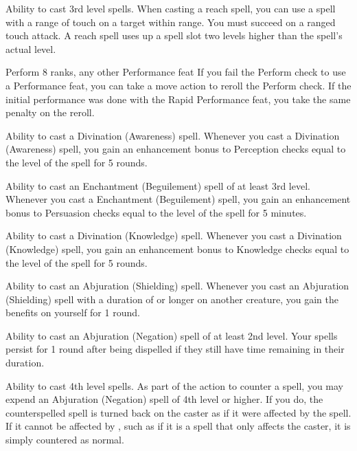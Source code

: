  Ability to cast 3rd level spells.
 When casting a reach spell, you can use a spell with a range of touch on a target within \rngclose range. You must succeed on a ranged touch attack. A reach spell uses up a spell slot two levels higher than the spell's actual level.

\featpre Perform 8 ranks, any other Performance feat
\featben If you fail the Perform check to use a Performance feat, you can take a move action to reroll the Perform check. If the initial performance was done with the Rapid Performance feat, you take the same  penalty on the reroll.

\featpre Ability to cast a Divination (Awareness) spell.
\featben Whenever you cast a Divination (Awareness) spell, you gain an enhancement bonus to Perception checks equal to the level of the spell for 5 rounds.

\featpre Ability to cast an Enchantment (Beguilement) spell of at least 3rd level.
\featben Whenever you cast a Enchantment (Beguilement) spell, you gain an enhancement bonus to Persuasion checks equal to the level of the spell for 5 minutes.

\featpre Ability to cast a Divination (Knowledge) spell.
\featben Whenever you cast a Divination (Knowledge) spell, you gain an enhancement bonus to Knowledge checks equal to the level of the spell for 5 rounds.

\featpre Ability to cast an Abjuration (Shielding) spell.
\featben Whenever you cast an Abjuration (Shielding) spell with a duration of \durshort or longer on another creature, you gain the benefits on yourself for 1 round.

\featpre Ability to cast an Abjuration (Negation) spell of at least 2nd level.
\featben Your spells persist for 1 round after being dispelled if they still have time remaining in their duration.

 Ability to cast 4th level spells.
 As part of the action to counter a spell, you may expend an Abjuration (Negation) spell of 4th level or higher. If you do, the counterspelled spell is turned back on the caster as if it were affected by the  spell. If it cannot be affected by , such as if it is a spell that only affects the caster, it is simply countered as normal.

